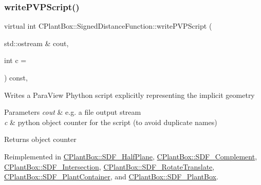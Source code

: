 \mbox{\label{classCPlantBox_1_1SignedDistanceFunction_a0098fb469c9be5557d5593cec9e76d2a}} 
\subsubsection{\texorpdfstring{write\+P\+V\+P\+Script()}{writePVPScript()}\hspace{0.1cm}{\footnotesize\ttfamily [1/2]}}
{\footnotesize\ttfamily virtual int C\+Plant\+Box\+::\+Signed\+Distance\+Function\+::write\+P\+V\+P\+Script (\begin{DoxyParamCaption}\item[{std\+::ostream \&}]{cout,  }\item[{int}]{c = {} }\end{DoxyParamCaption}) const\hspace{0.3cm}{\ttfamily [inline]}, {\ttfamily [virtual]}}

Writes a Para\+View Phython script explicitly representing the implicit geometry


\begin{DoxyParams}{Parameters}
{\em cout} & e.\+g. a file output stream \\
\hline
{\em c} & python object counter for the script (to avoid duplicate names) \\
\hline
\end{DoxyParams}
\begin{DoxyReturn}{Returns}
object counter 
\end{DoxyReturn}


Reimplemented in \hyperlink{classCPlantBox_1_1SDF__HalfPlane_aa635bfdd7990a3369c7ef5c9c9e627a2}{C\+Plant\+Box\+::\+S\+D\+F\+\_\+\+Half\+Plane}, \hyperlink{classCPlantBox_1_1SDF__Complement_a9409020aca8bc34c969f5808fe5ffb9a}{C\+Plant\+Box\+::\+S\+D\+F\+\_\+\+Complement}, \hyperlink{classCPlantBox_1_1SDF__Intersection_ad7d4972e0a71113d93c357eddac9ae99}{C\+Plant\+Box\+::\+S\+D\+F\+\_\+\+Intersection}, \hyperlink{classCPlantBox_1_1SDF__RotateTranslate_ace433edd29e6ff91c9513ca3ccb12f88}{C\+Plant\+Box\+::\+S\+D\+F\+\_\+\+Rotate\+Translate}, \hyperlink{classCPlantBox_1_1SDF__PlantContainer_a8ca6514a0f414aaa70526575d931edda}{C\+Plant\+Box\+::\+S\+D\+F\+\_\+\+Plant\+Container}, and \hyperlink{classCPlantBox_1_1SDF__PlantBox_a077239ab725f28c5a85e0e27749cc532}{C\+Plant\+Box\+::\+S\+D\+F\+\_\+\+Plant\+Box}.

